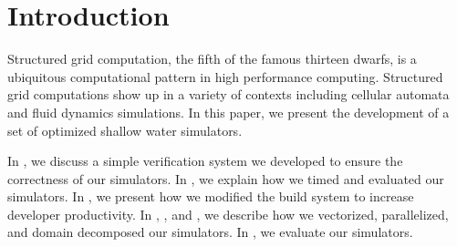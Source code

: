 \section{Introduction}\label{sec:intro}
Structured grid computation, the fifth of the famous thirteen dwarfs, is a
ubiquitous computational pattern in high performance computing. Structured grid
computations show up in a variety of contexts including cellular automata and
fluid dynamics simulations. In this paper, we present the development of a set
of optimized shallow water simulators.

In , we discuss a simple verification system we developed
to ensure the correctness of our simulators. In , we explain how
we timed and evaluated our simulators. In , we present how we
modified the build system to increase developer productivity. In
, , and , we
describe how we vectorized, parallelized, and domain decomposed our simulators.
In , we evaluate our simulators.
